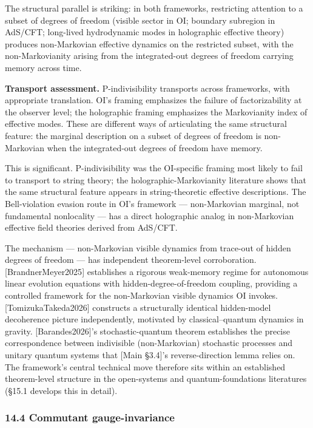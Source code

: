 \documentclass[
]{article}
\begin{document}
The structural parallel is striking: in both frameworks, restricting
attention to a subset of degrees of freedom (visible sector in OI;
boundary subregion in AdS/CFT; long-lived hydrodynamic modes in
holographic effective theory) produces non-Markovian effective dynamics
on the restricted subset, with the non-Markovianity arising from the
integrated-out degrees of freedom carrying memory across time.

\textbf{Transport assessment.} P-indivisibility transports across
frameworks, with appropriate translation. OI's framing emphasizes the
failure of factorizability at the observer level; the holographic
framing emphasizes the Markovianity index of effective modes. These are
different ways of articulating the same structural feature: the marginal
description on a subset of degrees of freedom is non-Markovian when the
integrated-out degrees of freedom have memory.

This is significant. P-indivisibility was the OI-specific framing most
likely to fail to transport to string theory; the
holographic-Markovianity literature shows that the same structural
feature appears in string-theoretic effective descriptions. The
Bell-violation evasion route in OI's framework --- non-Markovian
marginal, not fundamental nonlocality --- has a direct holographic
analog in non-Markovian effective field theories derived from AdS/CFT.

The mechanism --- non-Markovian visible dynamics from trace-out of
hidden degrees of freedom --- has independent theorem-level
corroboration. {[}BrandnerMeyer2025{]} establishes a rigorous
weak-memory regime for autonomous linear evolution equations with
hidden-degree-of-freedom coupling, providing a controlled framework for
the non-Markovian visible dynamics OI invokes. {[}TomizukaTakeda2026{]}
constructs a structurally identical hidden-model decoherence picture
independently, motivated by classical--quantum dynamics in gravity.
{[}Barandes2026{]}'s stochastic-quantum theorem establishes the precise
correspondence between indivisible (non-Markovian) stochastic processes
and unitary quantum systems that {[}Main §3.4{]}'s reverse-direction
lemma relies on. The framework's central technical move therefore sits
within an established theorem-level structure in the open-systems and
quantum-foundations literatures (§15.1 develops this in detail).

\hypertarget{commutant-gauge-invariance}{%
\subsubsection{14.4 Commutant
gauge-invariance}\label{commutant-gauge-invariance}}
\end{document}

